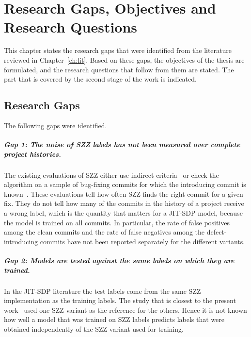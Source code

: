 \documentclass[12pt,a4paper,oneside]{report}
\begin{document}
\chapter{Research Gaps, Objectives and Research Questions}\label{ch:gaps}

This chapter states the research gaps that were identified from the
literature reviewed in Chapter~\ref{ch:lit}. Based on these gaps, the
objectives of the thesis are formulated, and the research questions that
follow from them are stated. The part that is covered by the second stage of
the work is indicated.

\section{Research Gaps}

The following gaps were identified.

\paragraph{Gap 1: The noise of SZZ labels has not been measured over complete
project histories.} The existing evaluations of SZZ either use indirect
criteria~\cite{dacosta2017maszz} or check the algorithm on a sample of
bug-fixing commits for which the introducing commit is
known~\cite{rosa2021oracle,rodriguez2020bugs}. These evaluations tell how
often SZZ finds the right commit for a given fix. They do not tell how many
of the commits in the history of a project receive a wrong label, which is
the quantity that matters for a JIT-SDP model, because the model is trained on
all commits. In particular, the rate of false positives among the clean
commits and the rate of false negatives among the defect-introducing commits
have not been reported separately for the different variants.

\paragraph{Gap 2: Models are tested against the same labels on which they are
trained.} In the JIT-SDP literature the test labels come from the same SZZ
implementation as the training labels. The study that is closest to the
present work~\cite{fan2021mislabeled} used one SZZ variant as the reference
for the others. Hence it is not known how well a model that was trained on
SZZ labels predicts labels that were obtained independently of the SZZ
variant used for training.
\end{document}
